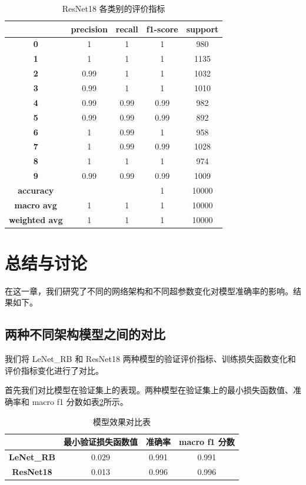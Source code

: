 \documentclass[supercite]{Experimental_Report}
\theoremstyle{definition}
\begin{document}
  \begin{table}[H]
	\centering
	\caption{ResNet18 各类别的评价指标}
	  \begin{tabular}{ccccc}
		\toprule
			& \textbf{precision} & \textbf{recall} & \textbf{f1-score} & \textbf{support} \\\hline
	  \textbf{0} & 1  & 1  & 1  & 980 \\
	  \textbf{1} & 1  & 1     & 1  & 1135 \\
	  \textbf{2} & 0.99  & 1  & 1  & 1032 \\
	  \textbf{3} & 0.99  & 1  & 1  & 1010 \\
	  \textbf{4} & 0.99  & 0.99  & 0.99  & 982 \\
	  \textbf{5} & 0.99  & 0.99  & 0.99  & 892 \\
	  \textbf{6} & 1     & 0.99  & 1  & 958 \\
	  \textbf{7} & 1  & 0.99     & 0.99  & 1028 \\
	  \textbf{8} & 1     & 1  & 1  & 974 \\
	  \textbf{9} & 0.99  & 0.99  & 0.99  & 1009 \\
	  \textbf{accuracy} &       &       & 1  & 10000 \\
	  \textbf{macro avg} & 1  & 1  & 1  & 10000 \\
	  \textbf{weighted avg} & 1  & 1  & 1  & 10000 \\\bottomrule
	  \end{tabular}
	\label{ResNet18各类别评价指标}
  \end{table}

\section{总结与讨论}
在这一章，我们研究了不同的网络架构和不同超参数变化对模型准确率的影响。结果如下。

\subsection{两种不同架构模型之间的对比}
我们将 LeNet\_RB 和 ResNet18 两种模型的验证评价指标、训练损失函数变化和评价指标变化进行了对比。

首先我们对比模型在验证集上的表现。两种模型在验证集上的最小损失函数值、准确率和 macro f1 分数如表\ref{模型对比表}所示。
\begin{table}[H]
	\centering
	\caption{模型效果对比表}
	  \begin{tabular}{cccc}
		\toprule
			& \textbf{最小验证损失函数值} & \textbf{准确率} & \textbf{macro f1 分数} \\\hline
	  \textbf{LeNet\_RB} & 0.029 & 0.991 & 0.991 \\
	  \textbf{ResNet18} & 0.013 & 0.996 & 0.996 \\
	  \bottomrule
	  \end{tabular}
	\label{模型对比表}
  \end{table}
\end{document}
